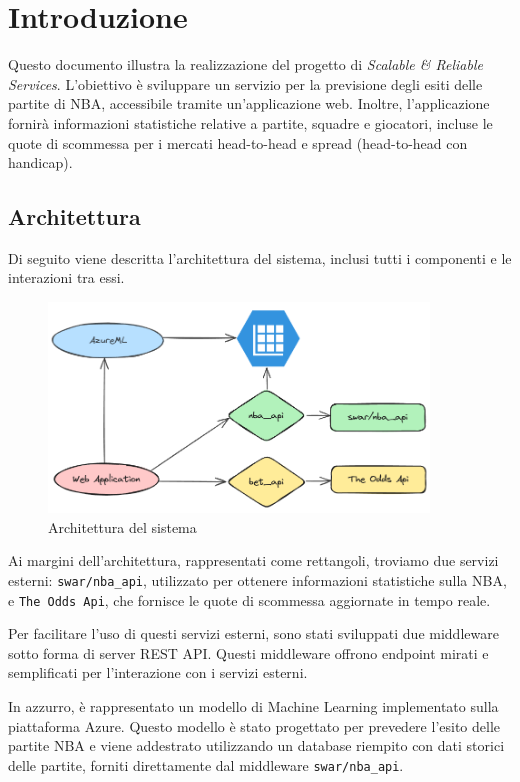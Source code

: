 \chapter{Introduzione}

Questo documento illustra la realizzazione del progetto di \textit{Scalable & Reliable Services}. L'obiettivo è sviluppare un servizio per la previsione degli esiti delle partite di NBA, accessibile tramite un'applicazione web. Inoltre, l'applicazione fornirà informazioni statistiche relative a partite, squadre e giocatori, incluse le quote di scommessa per i mercati head-to-head e spread (head-to-head con handicap).

\section{Architettura}

Di seguito viene descritta l'architettura del sistema, inclusi tutti i componenti e le interazioni tra essi.

\begin{figure}[H]
\centering
\includegraphics[width=0.9\textwidth]{img/architecture.png}
\caption{Architettura del sistema}
\end{figure}

Ai margini dell'architettura, rappresentati come rettangoli, troviamo due servizi esterni: \texttt{swar/nba\_api}, utilizzato per ottenere informazioni statistiche sulla NBA, e \texttt{The Odds Api}, che fornisce le quote di scommessa aggiornate in tempo reale.

Per facilitare l'uso di questi servizi esterni, sono stati sviluppati due middleware sotto forma di server REST API. Questi middleware offrono endpoint mirati e semplificati per l'interazione con i servizi esterni.

In azzurro, è rappresentato un modello di Machine Learning implementato sulla piattaforma Azure. Questo modello è stato progettato per prevedere l'esito delle partite NBA e viene addestrato utilizzando un database riempito con dati storici delle partite, forniti direttamente dal middleware \texttt{swar/nba\_api}.

